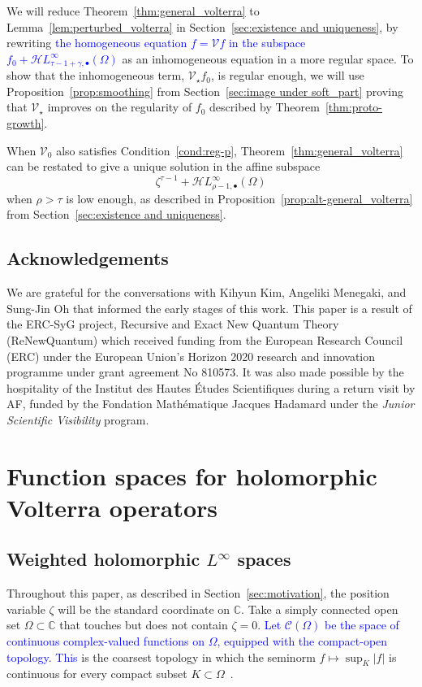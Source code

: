\documentclass[review]{siamart220329}
\newcommand{\C}{\mathbb{C}}
\newcommand{\cont}{\mathcal{C}}
\newcommand{\singexp}[2]{\mathcal{H}L^\infty_{#1, #2}}
\newcommand{\singexpalg}[1]{\singexp{#1}{\bullet}}
\newcommand{\volterra}{\mathcal{V}}
\newcommand{\hardpart}{\mathcal{V}_0}
\newcommand{\softpart}{\mathcal{V}_\star}
\newcommand{\domain}{\Omega}
\begin{document}
We will reduce Theorem~\ref{thm:general_volterra} to Lemma~\ref{lem:perturbed_volterra} in Section~\ref{sec:existence and uniqueness}, by rewriting \textcolor{blue}{the homogeneous equation $f = \volterra f$ in the subspace $f_0 + \singexpalg{\tau-1+\gamma}(\Omega)$} as an inhomogeneous equation in a more regular space. To show that the inhomogeneous term, $\softpart f_0$, is regular enough, we will use Proposition~\ref{prop:smoothing} from Section~\ref{sec:image under soft_part} proving that $\softpart$ improves on the regularity of $f_0$ described by Theorem~\ref{thm:proto-growth}.
\begin{rmk}
When $\hardpart$ also satisfies Condition~\eqref{cond:reg-p}, Theorem~\ref{thm:general_volterra} can be restated to give a unique solution in the affine subspace
\[ \zeta^{\tau-1} + \singexpalg{\rho-1}(\domain) \]
when $\rho > \tau$ is low enough, as described in Proposition~\ref{prop:alt-general_volterra} from Section~\ref{sec:existence and uniqueness}.
\end{rmk}
\subsection{Acknowledgements}
We are grateful for the conversations with Kihyun Kim, Angeliki Menegaki, and Sung-Jin Oh that informed the early stages of this work. This paper is a result of the ERC-SyG project, Recursive and Exact New Quantum Theory (ReNewQuantum) which received funding from the European Research Council (ERC) under the European Union's Horizon 2020 research and innovation programme under grant agreement No 810573. It was also made possible by the hospitality of the Institut des Hautes \'{E}tudes Scientifiques during a return visit by AF, funded by the Fondation Math\'{e}matique Jacques Hadamard under the \textit{Junior Scientific Visibility} program.
\section{Function spaces for holomorphic Volterra operators}\label{fn-spaces}
\subsection{Weighted holomorphic $L^{\infty}$ spaces}\label{sec:fn-space-defs}
Throughout this paper, as described in Section~\ref{sec:motivation}, the position variable $\zeta$ will be the standard coordinate on $\C$. Take a simply connected open set $\domain \subset \C$ that touches but does not contain $\zeta = 0$. \textcolor{blue}{Let $\cont(\domain)$ be the space of continuous complex-valued functions on $\domain$, equipped with the compact-open topology. This} is the coarsest topology in which the seminorm $f \mapsto \sup_K |f|$ is continuous for every compact subset $K \subset \domain$~\cite[Example~2.6 and Section~4 notes]{fnl-cpx-anal}.
\end{document}

